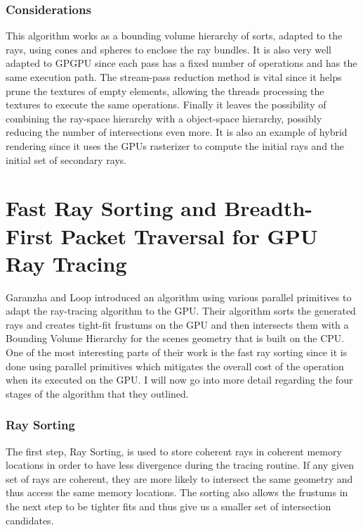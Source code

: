 \subsubsection{Considerations}

This algorithm works as a bounding volume hierarchy of sorts, adapted to the rays, using cones and spheres to enclose the ray bundles. It is also very well adapted to GPGPU since each pass has a fixed number of operations and has the same execution path. The stream-pass reduction method is vital since it helps prune the textures of empty elements, allowing the threads processing the textures to execute the same operations. Finally it leaves the possibility of combining the ray-space hierarchy with a object-space hierarchy, possibly reducing the number of intersections even more. It is also an example of hybrid rendering since it uses the GPUs rasterizer to compute the initial rays and the initial set of secondary rays.

\vfill

\section{Fast Ray Sorting and Breadth-First Packet Traversal for GPU Ray Tracing}
\label{section:backgroud_garanzha10}

Garanzha and Loop \cite{Garanzha10} introduced an algorithm using various parallel primitives to adapt the ray-tracing algorithm to the GPU. Their algorithm sorts the generated rays and creates tight-fit frustums on the GPU and then intersects them with a Bounding Volume Hierarchy for the scenes geometry that is built on the CPU. One of the most interesting parts of their work is the fast ray sorting since it is done using parallel primitives which mitigates the overall cost of the operation when its executed on the GPU. I will now go into more detail regarding the four stages of the algorithm that they outlined.

\medskip

\subsubsection{Ray Sorting}

The first step, Ray Sorting, is used to store coherent rays in coherent memory locations in order to have less divergence during the tracing routine. If any given set of rays are coherent, they are more likely to intersect the same geometry and thus access the same memory locations. The sorting also allows the frustums in the next step to be tighter fits and thus give us a smaller set of intersection candidates.

